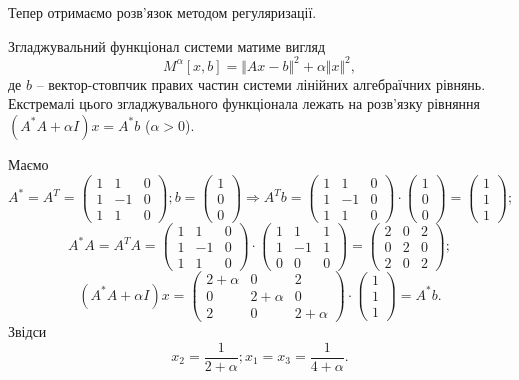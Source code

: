 \documentclass[14pt,twoside]{extreport}
\theoremstyle{mystyle}
\numberwithin{equation}{chapter}
\begin{document}
\begin{small}
Тепер отримаємо розв'язок методом регуляризації.

Згладжувальний функціонал системи матиме вигляд
\[
M^{\alpha}[x, b] = \Vert Ax-b\Vert^{2}+\alpha\Vert x\Vert^{2},
\]
де $b$ -- вектор-стовпчик правих частин системи лінійних алгебраїчних рівнянь. Екстремалі цього згладжувального функціонала лежать на розв'язку рівняння $(A^*A + \alpha I)x = A^*b$ ($\alpha > 0$).

Маємо
\[
 A^* = A^T =
\begin{pmatrix}
 1 &  1 & 0\\
 1 & -1 & 0\\
 1 &  1 & 0
\end{pmatrix};
 b =
\begin{pmatrix}
 1\\
 0\\
 0
\end{pmatrix} \Rightarrow
A^T b =
\begin{pmatrix}
 1 &  1 & 0\\
 1 & -1 & 0\\
 1 &  1 & 0
\end{pmatrix}\cdot
\begin{pmatrix}
 1\\
 0\\
 0
\end{pmatrix}
=\begin{pmatrix}
 1\\
 1\\
 1
\end{pmatrix};
\]
\[
  A^*A = A^T A=
\begin{pmatrix}
 1 &  1 & 0\\
 1 & -1 & 0\\
 1 &  1 & 0
\end{pmatrix}\cdot
\begin{pmatrix}
 1 &  1 & 1\\
 1 & -1 & 1\\
 0 &  0 & 0
\end{pmatrix}=
\begin{pmatrix}
 2 & 0 & 2\\
 0 & 2 & 0\\
 2 & 0 & 2
\end{pmatrix};
\]
\[
 (A^*A + \alpha I)x = \begin{pmatrix}
 2+\alpha & 0 & 2\\
 0 & 2+\alpha & 0\\
 2 & 0 & 2+\alpha
\end{pmatrix}\cdot
\begin{pmatrix}
 1\\
 1\\
 1
\end{pmatrix}=A^*b.
\]
Звідси
\[
 x_2= \dfrac{1}{2+\alpha}; x_1=x_3=\dfrac{1}{4+\alpha}.
\]


\end{small}
\end{document}
